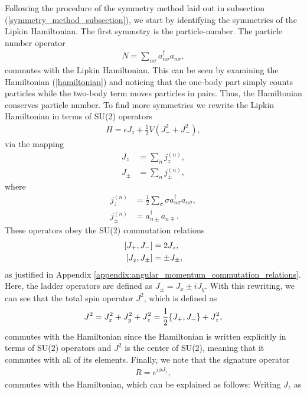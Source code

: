 \documentclass[Dual]{msu-thesis}
\begin{document}
Following the procedure of the symmetry method laid out in subsection (\ref{symmetry_method_subsection}), we start by identifying the symmetries of the Lipkin Hamiltonian. The first symmetry is the particle-number. The particle number operator
\begin{align}
N=\sum_{n\sigma}a^\dagger_{n\sigma}a_{n\sigma}
,\end{align}
commutes with the Lipkin Hamiltonian. This can be seen by examining the Hamiltonian (\ref{hamiltonian}) and noticing that the one-body part simply counts particles while the two-body term moves particles in pairs. Thus, the Hamiltonian conserves particle number. To find more symmetries we rewrite the Lipkin Hamiltonian in terms of SU(2) operators
\begin{align}
\label{lipkin_symmetry_hamiltonian}
H = \epsilon J_z + \frac{1}{2}V(J^2_++J^2_-),
\end{align}
via the mapping
\begin{align}
\label{jz}
J_z
&=
\sum_{n}j_z^{(n)},
\\
\label{jpm}
J_\pm&=\sum_nj^{(n)}_{\pm},
\end{align}
where
\begin{align}
\label{small_jz}
j_z^{(n)}
&=
\frac{1}{2}\sum_{\sigma}\sigma a^\dagger_{n\sigma}a_{n\sigma},
\\
\label{small_jpm}
j^{(n)}_{\pm}
&=
a^\dagger_{n\pm}a_{n\mp}.
\end{align}
These operators obey the SU(2) commutation relations
\begin{align}
\label{comm1}
\comm{J_+}{J_-}&=2J_z,
\\
\label{comm2}
\comm{J_z}{J_\pm}&=\pm J_\pm,
\end{align}
as justified in Appendix \ref{appendix:angular_momentum_commutation_relations}. Here, the ladder operators are defined as $J_{\pm}= J_x\pm iJ_y$. With this rewriting, we can see that the total spin operator $J^2$, which is defined as 
\begin{align}
J^2= J^2_x+J^2_y+J^2_z =
\frac{1}{2}\acomm{J_+}{J_-}+J_z^2
,\end{align}
commutes with the Hamiltonian since the Hamiltonian is written explicitly in terms of SU(2) operators and $J^2$ is the center of SU(2), meaning that it commutes with all of its elements. Finally, we note that the signature operator
\begin{align}
R=e^{i\phi J_z}
,\end{align}
commutes with the Hamiltonian, which can be explained as follows: Writing $J_z$ as
\end{document}
